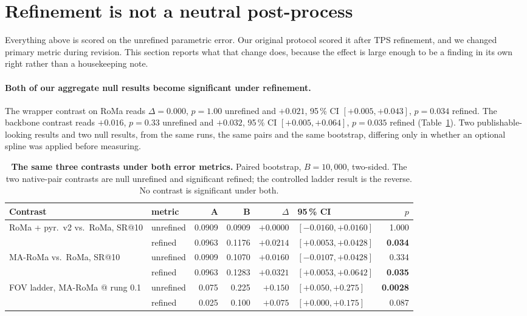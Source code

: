 \documentclass[10pt]{article}
\begin{document}
\section{Refinement is not a neutral post-process}
\label{sec:metric}

Everything above is scored on the unrefined parametric error. Our original protocol scored it after TPS refinement, and we changed primary metric during revision. This section reports what that change does, because the effect is large enough to be a finding in its own right rather than a housekeeping note.

\paragraph{Both of our aggregate null results become significant under refinement.} The wrapper contrast on RoMa reads $\Delta=0.000$, $p=1.00$ unrefined and $+0.021$, 95\,\% CI $[+0.005,+0.043]$, $p=0.034$ refined. The backbone contrast reads $+0.016$, $p=0.33$ unrefined and $+0.032$, 95\,\% CI $[+0.005,+0.064]$, $p=0.035$ refined (Table~\ref{tab:contrasts}). Two publishable-looking results and two null results, from the same runs, the same pairs and the same bootstrap, differing only in whether an optional spline was applied before measuring.

\begin{table}[t]
\centering
\small
\begin{tabular}{llrrrl r}
\toprule
Contrast & metric & A & B & $\Delta$ & 95\,\% CI & $p$ \\
\midrule
RoMa + pyr.\ v2 vs.\ RoMa, SR@10   & unrefined & 0.0909 & 0.0909 & $+0.0000$ & $[-0.0160,+0.0160]$ & 1.000 \\
                                   & refined   & 0.0963 & 0.1176 & $+0.0214$ & $[+0.0053,+0.0428]$ & \textbf{0.034} \\
MA-RoMa vs.\ RoMa, SR@10           & unrefined & 0.0909 & 0.1070 & $+0.0160$ & $[-0.0107,+0.0428]$ & 0.334 \\
                                   & refined   & 0.0963 & 0.1283 & $+0.0321$ & $[+0.0053,+0.0642]$ & \textbf{0.035} \\
FOV ladder, MA-RoMa @ rung 0.1     & unrefined & 0.075\phantom{0}  & 0.225\phantom{0}  & $+0.150$\phantom{0}  & $[+0.050,+0.275]$\phantom{0} & \textbf{0.0028} \\
                                   & refined   & 0.025\phantom{0}  & 0.100\phantom{0}  & $+0.075$\phantom{0}  & $[+0.000,+0.175]$\phantom{0} & 0.087 \\
\bottomrule
\end{tabular}
\caption{\textbf{The same three contrasts under both error metrics.} Paired bootstrap, $B=10{,}000$, two-sided. The two native-pair contrasts are null unrefined and significant refined; the controlled ladder result is the reverse. No contrast is significant under both.}
\label{tab:contrasts}
\end{table}
\end{document}
